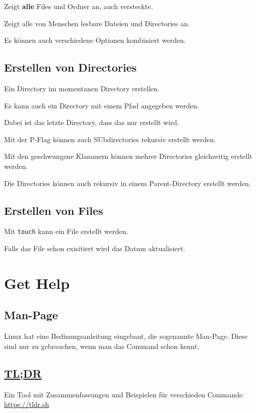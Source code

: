 \documentclass{article}
\begin{document}
Zeigt \textbf{alle} Files und Ordner an, auch versteckte.

Zeigt alle von Menschen lesbare Dateien und Directories an.

Es können auch verschiedene Optionen kombiniert werden.

\subsection{Erstellen von Directories}

Ein Directory im momentanen Directory erstellen.

Es kann auch ein Directory mit einem Pfad angegeben werden.

Dabei ist das letzte Directory, dass das nur erstellt wird.

Mit der P-Flag können auch SUbdirectories rekursiv erstellt werden.

Mit den geschwungene Klammern können mehrer Directories gleichzeitig erstellt werden.

Die Directories können auch rekursiv in einem Parent-Directory erstellt werden.

\subsection{Erstellen von Files}

Mit \texttt{touch} kann ein File erstellt werden.

Falls das File schon exisitiert wird das Datum aktualisiert.



\section*{Get Help}
\subsection*{Man-Page}
Linux hat eine Bedinungsanleitung eingebaut, die sogenannte Man-Page.
Diese sind nur zu gebrauchen, wenn man das Command schon kennt.

\subsection*{\href{https://tldr.sh/}{TL;DR}}
Ein Tool mit Zusammenfassungen und Beispielen für verschieden Commands: \href{https://tldr.sh/}{https://tldr.sh}
\end{document}
